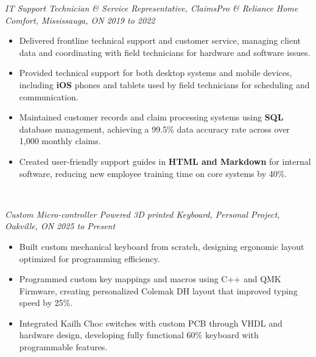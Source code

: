 \documentclass[9pt]{src/developercv}
\begin{document}
  \vspace{1.0\baselineskip}

  \textit{IT Support Technician \& Service Representative, ClaimsPro \& Reliance
  Home Comfort, Mississauga, ON} \hfill \textit{2019 to 2022}
  \begin{itemize}[leftmargin=2em, itemsep=0.1em]
    \item Delivered frontline technical support and customer service, managing
    client data and coordinating with field technicians for hardware and
    software issues.
    \item Provided technical support for both desktop systems and mobile devices,
    including \textbf{iOS} phones and tablets used by field technicians for
    scheduling and communication.
    \item Maintained customer records and claim processing systems using
    \textbf{SQL} database management, achieving a 99.5\% data accuracy rate
    across over 1,000 monthly claims.
    \item Created user-friendly support guides in \textbf{HTML and Markdown} for
    internal software, reducing new employee training time on core systems by
    40\%.
  \end{itemize}

  \vspace{\baselineskip}
  \colorbox{sky800}{\textcolor{white}{\LARGE\MakeUppercase{\textbf{Current Projects}}}}

  \vspace{1.0\baselineskip}
  
  \textit{Custom Micro-controller Powered 3D printed Keyboard, Personal Project,
  Oakville, ON} \hfill \textit{2025 to Present}
  \begin{itemize}[leftmargin=2em, itemsep=0.1em]
    \item Built custom mechanical keyboard from scratch, designing ergonomic
    layout optimized for programming efficiency.
    \item Programmed custom key mappings and macros using C++ and QMK Firmware,
    creating personalized Colemak DH layout that improved typing speed by 25\%.
    \item Integrated Kailh Choc switches with custom PCB through VHDL and
    hardware design, developing fully functional 60\% keyboard with programmable
    features.
  \end{itemize}
\end{document}
